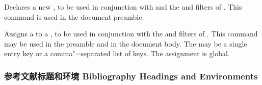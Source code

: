 \begin{ltxsyntax}


Declares a new , to be used in conjunction with  and the
 and  filters of . This command is used in the document preamble.


Assigns a  to a , to be used in conjunction with the  and  filters of . This command may be used in the preamble and in the document body. The  may be a single entry key or a comma"=separated list of keys. The assignment is global.

\end{ltxsyntax}

\subsubsection{参考文献标题和环境 Bibliography Headings and Environments}
\label{use:bib:hdg}

